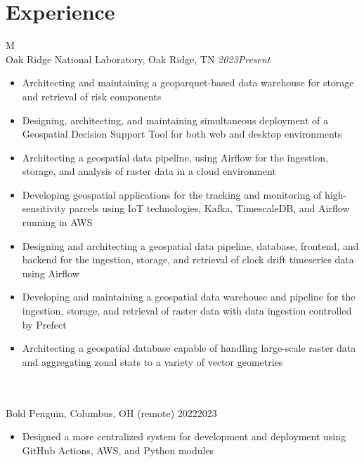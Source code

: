 \documentclass[10pt]{article}%
\begin{document}
\section*{\faCalendar{} Experience}
   \begin{tabularx}{\linewidth}{M}%
      \\
     Oak Ridge National Laboratory, Oak Ridge, TN \textit{2023\textemdash{}Present} \\
     \begin{itemize}[topsep=-12pt,parsep=0em]
         \setlength\itemsep{0em}
         \item Architecting and maintaining a geoparquet-based data warehouse for storage and retrieval of risk components %
         \item Designing, architecting, and maintaining simultaneous deployment of a Geospatial Decision Support Tool for both web and desktop environments %
         \item Architecting a geospatial data pipeline, using Airflow for the ingestion, storage, and analysis of raster data in a cloud environment %
         \item Developing geospatial applications for the tracking and monitoring of high-sensitivity parcels using IoT technologies, Kafka, TimescaleDB, and Airflow running in AWS %
         \item Designing and architecting a geospatial data pipeline, database, frontend, and backend for the ingestion, storage, and retrieval of clock drift timeseries data using Airflow %
         \item Developing and maintaining a geospatial data warehouse and pipeline for the ingestion, storage, and retrieval of raster data with data ingestion controlled by Prefect %
         \item Architecting a geospatial database capable of handling large-scale raster data and aggregating zonal stats to a variety of vector geometries %
     \end{itemize} \\
      \\
     Bold Penguin, Columbus, OH (remote) 2022\textemdash{}2023 \\
     \begin{itemize}[topsep=-12pt,parsep=0em]
         \setlength\itemsep{0em}
         \item Designed a more centralized system for development and deployment using GitHub Actions, AWS, and Python modules %

\end{itemize}
\end{tabularx}
\end{document}
